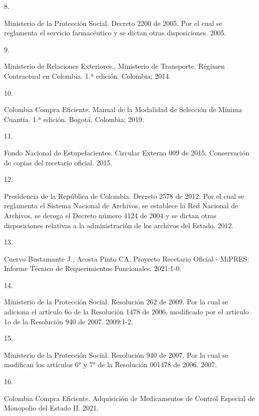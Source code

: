 \documentclass[
]{book}
\newlength{\cslhangindent}
\newlength{\csllabelwidth}
\newlength{\cslentryspacingunit} %
\newenvironment{CSLReferences}[2] %
 {%
  \setlength{\parindent}{0pt}
  \ifodd #1
  \let\oldpar\par
  \def\par{\hangindent=\cslhangindent\oldpar}
  \fi
  \setlength{\parskip}{#2\cslentryspacingunit}
 }%
 {}
\newcommand{\CSLLeftMargin}[1]{\parbox[t]{\csllabelwidth}{#1}}
\newcommand{\CSLRightInline}[1]{\parbox[t]{\linewidth - \csllabelwidth}{#1}\break}
\begin{document}
\begin{CSLReferences}{0}{0}
\leavevmode{}%
\CSLLeftMargin{8. }
\CSLRightInline{Ministerio de la Protección Social. {Decreto 2200 de 2005. Por el cual se reglamenta el servicio farmac{é}utico y se dictan otras disposiciones.} 2005.}

\leavevmode{}%
\CSLLeftMargin{9. }
\CSLRightInline{Ministerio de Relaciones Exteriores., Ministerio de Transporte. {R{é}gimen Contractual en Colombia}. 1.ª edición. Colombia; 2014.}

\leavevmode{}%
\CSLLeftMargin{10. }
\CSLRightInline{Colombia Compra Eficiente. {Manual de la Modalidad de Selecci{ó}n de M{í}nima Cuant{í}a}. 1.ª edición. Bogot{á}, Colombia; 2019.}

\leavevmode{}%
\CSLLeftMargin{11. }
\CSLRightInline{Fondo Nacional de Estupefacientes. {Circular Externa 009 de 2015. Conservaci{ó}n de copias del recetario oficial.} 2015.}

\leavevmode{}%
\CSLLeftMargin{12. }
\CSLRightInline{Presidencia de la República de Colombia. {Decreto 2578 de 2012. Por el cual se reglamenta el Sistema Nacional de Archivos, se establece la Red Nacional de Archivos, se deroga el Decreto n{ú}mero 4124 de 2004 y se dictan otras disposiciones relativas a la administraci{ó}n de los archivos del Estado.} 2012.}

\leavevmode{}%
\CSLLeftMargin{13. }
\CSLRightInline{Cuervo Bustamante J., Acosta Pinto CA. {Proyecto Recetario Oficial - MiPRES: Informe T{é}cnico de Requerimientos Funcionales}. 2021:1-0.}

\leavevmode{}%
\CSLLeftMargin{14. }
\CSLRightInline{Ministerio de la Protección Social. {Resoluci{ó}n 262 de 2009. Por la cual se adiciona el art{í}culo 6o de la Resoluci{ó}n 1478 de 2006, modificado por el art{í}culo 1o de la Resoluci{ó}n 940 de 2007.} 2009:1-2.}

\leavevmode{}%
\CSLLeftMargin{15. }
\CSLRightInline{Ministerio de la Protección Social. {Resoluci{ó}n 940 de 2007. Por la cual se modifican los art{í}culos 6° y 7° de la Resoluci{ó}n 001478 de 2006}. 2007.}

\leavevmode{}%
\CSLLeftMargin{16. }
\CSLRightInline{Colombia Compra Eficiente. {Adquisici{ó}n de Medicamentos de Control Especial de Monopolio del Estado II}. 2021.}


\end{CSLReferences}
\end{document}
